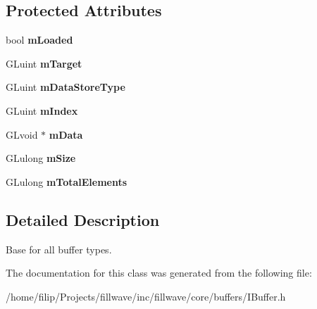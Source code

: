 \subsection*{Protected Attributes}
\begin{DoxyCompactItemize}
\item 
bool {\bfseries m\+Loaded}\hypertarget{classflw_1_1flc_1_1IBuffer_a7012500f1c886ae84e9bd7d878f70a8b}{}\label{classflw_1_1flc_1_1IBuffer_a7012500f1c886ae84e9bd7d878f70a8b}

\item 
G\+Luint {\bfseries m\+Target}\hypertarget{classflw_1_1flc_1_1IBuffer_a3d34efd1977e2ea9b859b32458c23236}{}\label{classflw_1_1flc_1_1IBuffer_a3d34efd1977e2ea9b859b32458c23236}

\item 
G\+Luint {\bfseries m\+Data\+Store\+Type}\hypertarget{classflw_1_1flc_1_1IBuffer_a099516254495f4a99e65121816d02bab}{}\label{classflw_1_1flc_1_1IBuffer_a099516254495f4a99e65121816d02bab}

\item 
G\+Luint {\bfseries m\+Index}\hypertarget{classflw_1_1flc_1_1IBuffer_ad6cf73186e60ec40248b14c5b11f00ee}{}\label{classflw_1_1flc_1_1IBuffer_ad6cf73186e60ec40248b14c5b11f00ee}

\item 
G\+Lvoid $\ast$ {\bfseries m\+Data}\hypertarget{classflw_1_1flc_1_1IBuffer_ad576bb156f18bf6050414445ce768737}{}\label{classflw_1_1flc_1_1IBuffer_ad576bb156f18bf6050414445ce768737}

\item 
G\+Lulong {\bfseries m\+Size}\hypertarget{classflw_1_1flc_1_1IBuffer_af6d84c87b8a85e193de1c7d62e0c5098}{}\label{classflw_1_1flc_1_1IBuffer_af6d84c87b8a85e193de1c7d62e0c5098}

\item 
G\+Lulong {\bfseries m\+Total\+Elements}\hypertarget{classflw_1_1flc_1_1IBuffer_a64fbd477df8e2731e70198cf43f59577}{}\label{classflw_1_1flc_1_1IBuffer_a64fbd477df8e2731e70198cf43f59577}

\end{DoxyCompactItemize}


\subsection{Detailed Description}
Base for all buffer types. 

The documentation for this class was generated from the following file\+:\begin{DoxyCompactItemize}
\item 
/home/filip/\+Projects/fillwave/inc/fillwave/core/buffers/I\+Buffer.\+h\end{DoxyCompactItemize}
